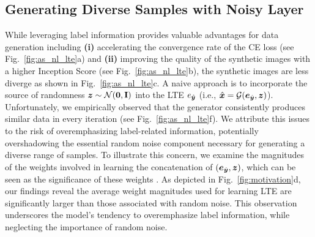 \documentclass{article} %
\begin{document}
\subsection{Generating Diverse Samples with Noisy Layer}

While leveraging label information provides valuable advantages for data generation including \textbf{(i)} accelerating the convergence rate of the CE loss (see Fig.~\ref{fig:as_nl_lte}a) and \textbf{(ii)} improving the quality of the synthetic images with a higher Inception Score (see Fig.~\ref{fig:as_nl_lte}b), the synthetic images are less diverge as shown in Fig.~\ref{fig:as_nl_lte}c. A naive approach is to incorporate the source of randomness ${\bm{z}} \sim \mathcal{N}(\boldsymbol{0}, \mathbf{I})$ into the LTE $e_{\hat{{\bm{y}}}}$ (i.e., $\hat{{\bm{x}}} = \mathcal{G}({\bm{e}}_{\hat{{\bm{y}}}}, {\bm{z}})$). Unfortunately, we empirically observed that the generator consistently produces similar data in every iteration (see Fig.~\ref{fig:as_nl_lte}f). We attribute this issues to the risk of overemphasizing label-related information, potentially overshadowing the essential random noise component necessary for generating a diverse range of samples. To illustrate this concern, we examine the magnitudes of the weights involved in learning the concatenation of $({\bm{e}}_{\hat{{\bm{y}}}}, {\bm{z}})$, which can be seen as the significance of these weights \citep{lottery}. As depicted in Fig.~\ref{fig:motivation}d, our findings reveal the average weight magnitudes used for learning LTE are significantly larger than those associated with random noise. This observation underscores the model's tendency to overemphasize label information, while neglecting the importance of random noise.
\end{document}
